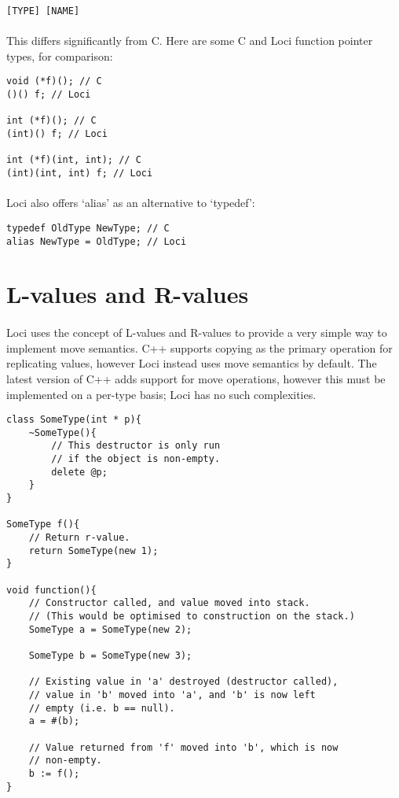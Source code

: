 \documentclass[12pt,twoside,notitlepage]{report}
\begin{document}
\begin{verbatim}
[TYPE] [NAME]
\end{verbatim}

\paragraph{}
This differs significantly from C. Here are some C and Loci function pointer types, for comparison:

\begin{verbatim}
void (*f)(); // C
()() f; // Loci

int (*f)(); // C
(int)() f; // Loci

int (*f)(int, int); // C
(int)(int, int) f; // Loci
\end{verbatim}

\paragraph{}
Loci also offers `alias' as an alternative to `typedef':

\begin{verbatim}
typedef OldType NewType; // C
alias NewType = OldType; // Loci
\end{verbatim}

\section{L-values and R-values}

\paragraph{}
Loci uses the concept of L-values and R-values to provide a very simple way to implement move semantics. C++ supports copying as the primary operation for replicating values, however Loci instead uses move semantics by default. The latest version of C++ adds support for move operations, however this must be implemented on a per-type basis; Loci has no such complexities.

\small{
\begin{verbatim}
class SomeType(int * p){
    ~SomeType(){
        // This destructor is only run
        // if the object is non-empty.
    	delete @p;
    }
}

SomeType f(){
    // Return r-value.
    return SomeType(new 1);
}

void function(){
    // Constructor called, and value moved into stack.
    // (This would be optimised to construction on the stack.)
    SomeType a = SomeType(new 2);
    
    SomeType b = SomeType(new 3);
    
    // Existing value in 'a' destroyed (destructor called),
    // value in 'b' moved into 'a', and 'b' is now left
    // empty (i.e. b == null).
    a = #(b);
    
    // Value returned from 'f' moved into 'b', which is now
    // non-empty.
    b := f();
}
\end{verbatim}
}
\end{document}
